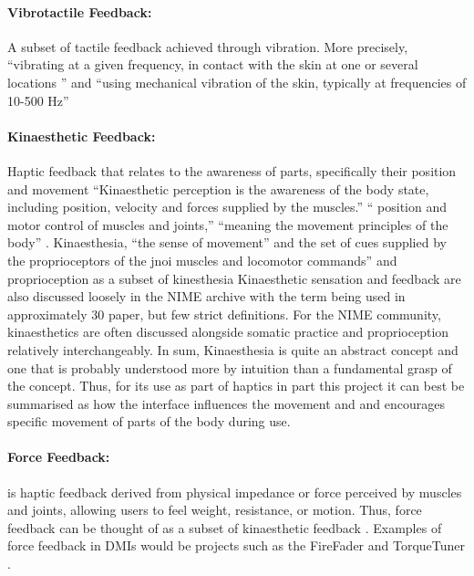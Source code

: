 \paragraph{Vibrotactile Feedback:} A subset of tactile feedback achieved through
vibration. More precisely, ``vibrating at a given frequency, in contact with the
skin at one or several locations \cite{rovan_typology_2000}'' and ``using
mechanical vibration of the skin, typically at frequencies of 10-500 Hz''
\cite{kaczmarek_electrotactile_1991}

\paragraph{Kinaesthetic Feedback:} Haptic feedback that relates to the awareness
of parts, specifically their position and movement ``Kinaesthetic perception is
the awareness of the body state, including position, velocity and forces
supplied by the muscles.'' \cite{palacio_eight_2008}  `` position and motor
control of muscles and joints,'' \cite{hayes_vibrotactile_2011} ``meaning the
movement principles of the body'' \cite{bokowiec_ritual_2011}. 
Kinaesthesia, ``the sense of movement'' and the  set of cues supplied by the proprioceptors of the jnoi muscles and locomotor commands'' and proprioception as a subset of kinesthesia \cite[][p. 26 - 32]{berthoz_brain_2000}
Kinaesthetic sensation and feedback are also discussed loosely in the NIME archive with the
term being used in approximately 30 paper, but few strict definitions. For the
NIME community, kinaesthetics are often discussed alongside somatic practice and
proprioception relatively interchangeably.  
In sum, Kinaesthesia is quite an abstract concept and one that is probably
understood more by intuition than a fundamental grasp of the concept. Thus, for
its use as part of haptics in part this project it can best be summarised as how
the interface influences the movement and and encourages specific movement of
parts of the body during use. 

\paragraph{Force Feedback:} is haptic feedback derived from physical impedance \cite{giordano_force_2012} or force perceived by muscles and joints, allowing users to feel weight, resistance, or motion. Thus, force feedback can be thought of as a subset of kinaesthetic feedback \cite{kirkegaard_torquetuner_2020}.  Examples of force feedback in DMIs would be projects such as the FireFader
\cite{berdahl_firefader_2013} and TorqueTuner
\cite{kirkegaard_torquetuner_2020}. \newline
    
